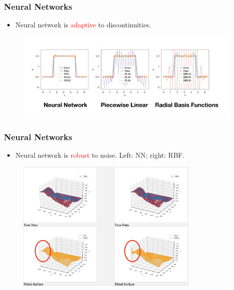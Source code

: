 \documentclass{beamer}
\newcommand{\red}[1]{\textcolor{red}{#1}}
\begin{document}
\begin{frame}


\frametitle{Neural Networks}

\begin{itemize}
	\item Neural network is \red{adaptive} to discontinuities.
\end{itemize}
\begin{figure}[hbt]
  \includegraphics[width=1.0\textwidth]{figures/nn_compare}
\end{figure}

\end{frame}



\begin{frame}

\frametitle{Neural Networks}

\begin{itemize}
	\item Neural network is \red{robust} to noise. Left: NN; right: RBF.
\end{itemize}
\begin{figure}[hbt]
  \includegraphics[width=0.8\textwidth]{figures/nn2}
\end{figure}

\end{frame}
\end{document}
